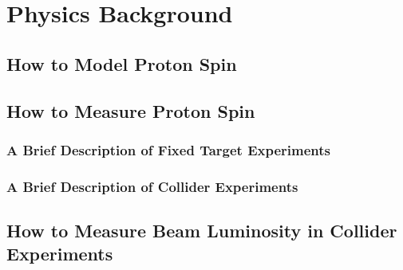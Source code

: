 \chapter{Physics Background}
\section{How to Model Proton Spin}
\section{How to Measure Proton Spin}
\subsection{A Brief Description of Fixed Target Experiments}
\subsection{A Brief Description of Collider Experiments}
\section{How to Measure Beam Luminosity in Collider Experiments}

